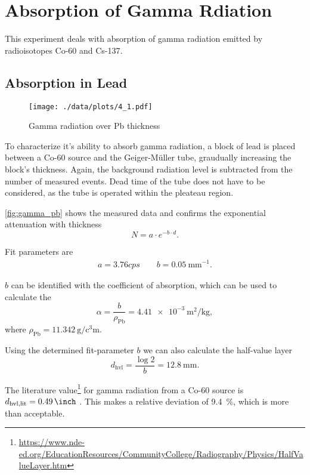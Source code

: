 \chapter{Absorption of Gamma Rdiation}
This experiment deals with absorption of gamma radiation emitted by radioisotopes Co-60 and Cs-137.

\section{Absorption in Lead}
\begin{figure}[ht!]
	\centering
	\texttt{[image: ./data/plots/4\_1.pdf]}
	\caption[Gamma radiation over Pb thickness]{Gamma radiation over Pb thickness}
	\label{fig:gamma_pb}
\end{figure}
To characterize it's ability to absorb gamma radiation, a block of lead is placed between a Co-60 source and the Geiger-Müller tube, graudually increasing the block's thickness.
Again, the background radiation level is subtracted from the number of measured events.
Dead time of the tube does not have to be considered, as the tube is operated within the pleateau region.

\autoref{fig:gamma_pb} shows the measured data and confirms the exponential attenuation with thickness
\begin{equation*}
	N = a \cdot e^{-b \cdot d}.
\end{equation*}

Fit parameters are
\begin{gather*}
	a=\num{3.76}cps\qquad b=\SI{0.05}{\milli\meter}^{-1}.
\end{gather*}

$b$ can be identified with the coefficient of absorption, which can be used to calculate the 
\begin{equation*}
	\alpha=\frac{b}{\rho_\text{Pb}}=\SI{4.41e-3}{\meter\squared\per\kilogram},
\end{equation*}
where $\rho_\text{Pb}=\SI{11.342}{\gram\per\cubic\centi\meter}$.

Using the determined fit-parameter $b$ we can also calculate the half-value layer
\begin{equation*}
	d_\text{hvl}=\frac{\log{2}}{b}=\SI{12.8}{\milli\meter}.
\end{equation*}

The literature value\footnote{\url{https://www.nde-ed.org/EducationResources/CommunityCollege/Radiography/Physics/HalfValueLayer.htm}} for gamma radiation from a Co-60 source is $d_\text{hvl,lit}=\SI{0.49}{\inch}$ .
This makes a relative deviation of \SI{9.4}{\percent}, which is more than acceptable.
